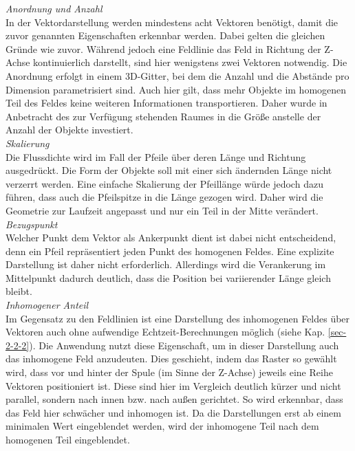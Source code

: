 \textit{Anordnung und Anzahl}\\
In der Vektordarstellung werden mindestens acht Vektoren benötigt, damit die zuvor genannten Eigenschaften erkennbar werden. Dabei gelten die gleichen Gründe wie zuvor. Während jedoch eine Feldlinie das Feld in Richtung der Z-Achse kontinuierlich darstellt, sind hier wenigstens zwei Vektoren notwendig. Die Anordnung erfolgt in einem 3D-Gitter, bei dem die Anzahl und die Abstände pro Dimension parametrisiert sind. Auch hier gilt, dass mehr Objekte im homogenen Teil des Feldes keine weiteren Informationen transportieren. Daher wurde in Anbetracht des zur Verfügung stehenden Raumes in die Größe anstelle der Anzahl der Objekte investiert.\\

\textit{Skalierung}\\
Die Flussdichte wird im Fall der Pfeile über deren Länge und Richtung ausgedrückt. Die Form der Objekte soll mit einer sich ändernden Länge nicht verzerrt werden. Eine einfache Skalierung der Pfeillänge würde jedoch dazu führen, dass auch die Pfeilspitze in die Länge gezogen wird. Daher wird die Geometrie zur Laufzeit angepasst und nur ein Teil in der Mitte verändert.\\

\textit{Bezugspunkt}\\
Welcher Punkt dem Vektor als Ankerpunkt dient ist dabei nicht entscheidend, denn ein Pfeil repräsentiert jeden Punkt des homogenen Feldes. Eine explizite Darstellung ist daher nicht erforderlich. Allerdings wird die Verankerung im Mittelpunkt dadurch deutlich, dass die Position bei variierender Länge gleich bleibt.\\

\textit{Inhomogener Anteil}\\
Im Gegensatz zu den Feldlinien ist eine Darstellung des inhomogenen Feldes über Vektoren auch ohne aufwendige Echtzeit-Berechnungen möglich (siehe Kap. \ref{sec-2-2-2}). Die Anwendung nutzt diese Eigenschaft, um in dieser Darstellung auch das inhomogene Feld anzudeuten. Dies geschieht, indem das Raster so gewählt wird, dass vor und hinter der Spule (im Sinne der Z-Achse) jeweils eine Reihe Vektoren positioniert ist. Diese sind hier im Vergleich deutlich kürzer und nicht parallel, sondern nach innen bzw. nach außen gerichtet. So wird erkennbar, dass das Feld hier schwächer und inhomogen ist. Da die Darstellungen erst ab einem minimalen Wert eingeblendet werden, wird der inhomogene Teil nach dem homogenen Teil eingeblendet.\\

